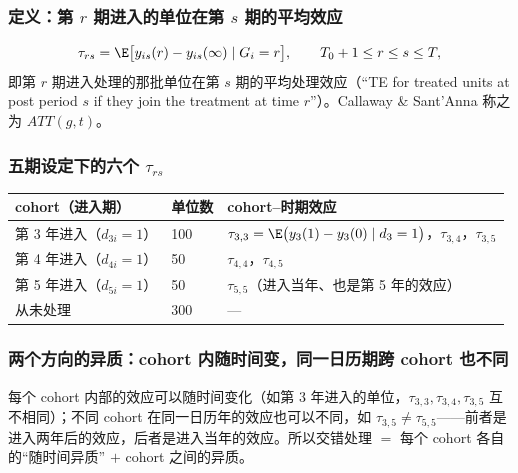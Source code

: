 \subsubsection{定义：第 \texorpdfstring{$r$}{r} 期进入的单位在第 \texorpdfstring{$s$}{s} 期的平均效应}

\begin{defn}\label{def:U15b-taurs}
\[
\tau_{rs}=\E\bigl[y_{is}(r)-y_{is}(\infty)\mid G_i=r\bigr],\qquad T_0+1\le r\le s\le T,
\]
即第 $r$ 期进入处理的那批单位在第 $s$ 期的平均处理效应（“TE for treated units at post period $s$ if they join the treatment at time $r$”）。Callaway \& Sant'Anna 称之为 $ATT(g,t)$。
\end{defn}

\subsubsection{五期设定下的六个 \texorpdfstring{$\tau_{rs}$}{tau\_rs}}

\begin{center}
\small
\begin{tabularx}{\linewidth}{llL}
\toprule
cohort（进入期） & 单位数 & cohort--时期效应\\
\midrule
第 3 年进入（$d_{3i}=1$） & 100 & $\tau_{3,3}=\E\bigl(y_3(1)-y_3(0)\mid d_3=1\bigr)$，$\tau_{3,4}$，$\tau_{3,5}$\\
第 4 年进入（$d_{4i}=1$） & 50 & $\tau_{4,4}$，$\tau_{4,5}$\\
第 5 年进入（$d_{5i}=1$） & 50 & $\tau_{5,5}$（进入当年、也是第 5 年的效应）\\
从未处理 & 300 & —\\
\bottomrule
\end{tabularx}
\end{center}

\subsubsection{两个方向的异质：cohort 内随时间变，同一日历期跨 cohort 也不同}

每个 cohort 内部的效应可以随时间变化（如第 3 年进入的单位，$\tau_{3,3},\tau_{3,4},\tau_{3,5}$ 互不相同）；不同 cohort 在同一日历年的效应也可以不同，如 $\tau_{3,5}\ne\tau_{5,5}$——前者是进入两年后的效应，后者是进入当年的效应。所以交错处理 $=$ 每个 cohort 各自的“随时间异质” $+$ cohort 之间的异质。

